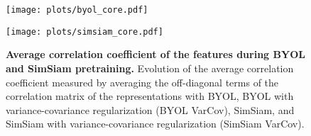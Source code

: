 \documentclass{article}
\begin{document}
\begin{figure}
    \hspace{-4em}
    \centering
    \begin{minipage}{0.4\textwidth}
        \centering
        \texttt{[image: plots/byol\_core.pdf]} \end{minipage}\hspace{5em}
    \begin{minipage}{0.4\textwidth}
        \centering
        \texttt{[image: plots/simsiam\_core.pdf]} \end{minipage}
    \caption{\textbf{Average correlation coefficient of the features during BYOL and SimSiam pretraining.} Evolution of the average correlation coefficient measured by averaging the off-diagonal terms of the correlation matrix of the representations with BYOL, BYOL with variance-covariance regularization (BYOL VarCov), SimSiam, and SimSiam with variance-covariance regularization (SimSiam VarCov).}
    \label{fig:byol_simsiam_cor}
\end{figure}

 
\end{document}
